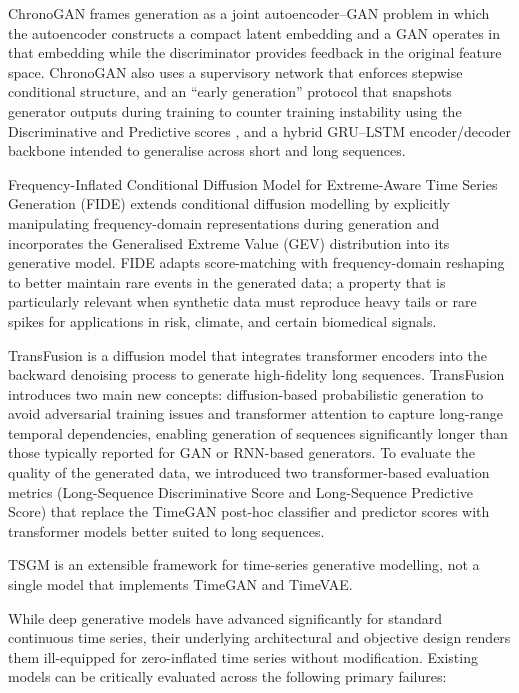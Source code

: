 \documentclass[make,article,submit,moreauthors]{Definitions/mdpi}
\begin{document}
ChronoGAN \cite{ref4} frames generation as a joint autoencoder–GAN problem in which the autoencoder constructs a compact latent embedding and a GAN operates in that embedding while the discriminator provides feedback in the original feature space. ChronoGAN also uses a supervisory network that enforces stepwise conditional structure, and an “early generation” protocol that snapshots generator outputs during training to counter training instability using the Discriminative and Predictive scores \cite{ref2,ref25}, and a hybrid GRU–LSTM encoder/decoder backbone intended to generalise across short and long sequences. 

Frequency-Inflated Conditional Diffusion Model for Extreme-Aware Time Series Generation (FIDE) \cite{ref28} extends conditional diffusion modelling by explicitly manipulating frequency-domain representations during generation and incorporates the Generalised Extreme Value (GEV) distribution into its generative model. FIDE adapts score-matching with frequency-domain reshaping to better maintain rare events in the generated data; a property that is particularly relevant when synthetic data must reproduce heavy tails or rare spikes for applications in risk, climate, and certain biomedical signals.

TransFusion \cite{ref29} is a diffusion model that integrates transformer encoders into the backward denoising process to generate high-fidelity long sequences. TransFusion introduces two main new concepts: diffusion-based probabilistic generation to avoid adversarial training issues and transformer attention to capture long-range temporal dependencies, enabling generation of sequences significantly longer than those typically reported for GAN or RNN-based generators. To evaluate the quality of the generated data, we introduced two transformer-based evaluation metrics (Long-Sequence Discriminative Score and Long-Sequence Predictive Score) \cite{ref29} that replace the TimeGAN post-hoc classifier and predictor scores with transformer models better suited to long sequences.

TSGM \cite{ref30} is an extensible framework for time-series generative modelling, not a single model that implements TimeGAN and TimeVAE.


While deep generative models have advanced significantly for standard continuous time series, their underlying architectural and objective design renders them ill-equipped for zero-inflated time series without modification. Existing models can be critically evaluated across the following primary failures:
\end{document}
